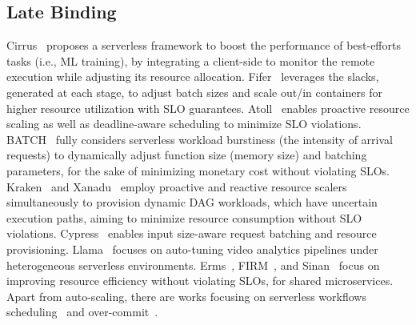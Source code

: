 \subsection{Late Binding}

Cirrus~\cite{socc19-cirrus} proposes a serverless framework to boost the performance of best-efforts tasks (i.e., ML training), by integrating a client-side to monitor the remote execution while adjusting its resource allocation.
Fifer~\cite{middleware20-fifer} leverages the slacks, generated at each stage, to adjust batch sizes and scale out/in containers for higher resource utilization with SLO guarantees.
Atoll~\cite{socc21-atoll} enables proactive resource scaling as well as deadline-aware scheduling to minimize SLO violations.
BATCH~\cite{sc20-batch} fully considers serverless workload burstiness (the intensity of arrival requests) to dynamically adjust function size (memory size) and batching parameters, for the sake of minimizing monetary cost without violating SLOs.
Kraken~\cite{socc21-kraken} and Xanadu~\cite{middleware20-xanadu} employ proactive and reactive resource scalers simultaneously to provision dynamic DAG workloads, which have uncertain execution paths, aiming to minimize resource consumption without SLO violations.
Cypress~\cite{socc22-cypress} enables input size-aware request batching and resource provisioning. 
Llama~\cite{socc21-llama} focuses on auto-tuning video analytics pipelines under heterogeneous serverless environments.
Erms~\cite{asplos23-erms}, FIRM~\cite{osdi20-firm}, and Sinan~\cite{asplos21-sinan} focus on improving resource efficiency without violating SLOs, for shared microservices.
Apart from auto-scaling, there are works focusing on serverless workflows scheduling~\cite{socc20-sequoia,arxiv22-resc,ic2e22-fusionize,socc20-wukong,atc21-sonic,atc21-faastlane,asplos22-faasflow,sigcomm24-yuanrong} and over-commit~\cite{socc22-owl,socc23-golgi}.




